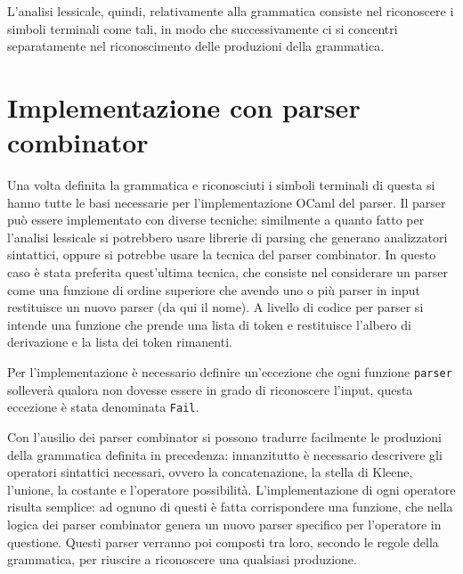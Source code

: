 \documentclass[12pt,a4paper]{report}
\begin{document}
L'analisi lessicale, quindi, relativamente alla grammatica consiste nel
riconoscere i simboli terminali come tali, in modo che successivamente
ci si concentri separatamente nel riconoscimento delle produzioni della
grammatica.

\hypertarget{implementazione-con-parser-combinator}{%
\section{Implementazione con parser
combinator}\label{implementazione-con-parser-combinator}}

Una volta definita la grammatica e riconosciuti i simboli terminali di
questa si hanno tutte le basi necessarie per l'implementazione OCaml del
parser. Il parser può essere implementato con diverse tecniche:
similmente a quanto fatto per l'analisi lessicale si potrebbero usare
librerie di parsing che generano analizzatori sintattici, oppure si
potrebbe usare la tecnica del parser combinator. In questo caso è stata
preferita quest'ultima tecnica, che consiste nel considerare un parser
come una funzione di ordine superiore che avendo uno o più parser in
input restituisce un nuovo parser (da qui il nome). A livello di codice
per parser si intende una funzione che prende una lista di token e
restituisce l'albero di derivazione e la lista dei token rimanenti.

\begin{Shaded}
\begin{Highlighting}[]
\NormalTok{ = }
\NormalTok{)}
\end{Highlighting}
\end{Shaded}

Per l'implementazione è necessario definire un'eccezione che ogni
funzione \texttt{parser} solleverà qualora non dovesse essere in grado
di riconoscere l'input, questa eccezione è stata denominata
\texttt{Fail}.

Con l'ausilio dei parser combinator si possono tradurre facilmente le
produzioni della grammatica definita in precedenza: innanzitutto è
necessario descrivere gli operatori sintattici necessari, ovvero la
concatenazione, la stella di Kleene, l'unione, la costante e l'operatore
possibilità. L'implementazione di ogni operatore risulta semplice: ad
ognuno di questi è fatta corrispondere una funzione, che nella logica
dei parser combinator genera un nuovo parser specifico per l'operatore
in questione. Questi parser verranno poi composti tra loro, secondo le
regole della grammatica, per riuscire a riconoscere una qualsiasi
produzione.
\end{document}

